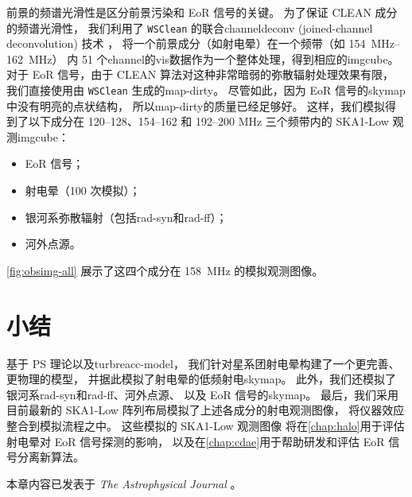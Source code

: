 前景的频谱光滑性是区分前景污染和 EoR 信号的关键。
为了保证 CLEAN 成分的频谱光滑性，
我们利用了 \texttt{WSClean} 的联合\ac{channel}\ac{deconv}
(joined-channel deconvolution) 技术 \cite{offringa2017}，
将一个前景成分（如射电晕）在一个频带（如 \SIrange{154}{162}{\MHz}）
内 51 个\ac{channel}的\ac{vis}数据作为一个整体处理，得到相应的\ac{imgcube}。
对于 EoR 信号，由于 CLEAN 算法对这种非常暗弱的弥散辐射处理效果有限，
我们直接使用由 \texttt{WSClean} 生成的\ac{map-dirty}。
尽管如此，因为 EoR 信号的\ac{skymap}中没有明亮的点状结构，
所以\ac{map-dirty}的质量已经足够好。
这样，我们模拟得到了以下成分在 \numrange{120}{128}、\numrange{154}{162}
和 \numrange{192}{200} \si{\MHz} 三个频带内的 SKA1-Low 观测\ac{imgcube}：
\begin{itemize}
  \item EoR 信号；
  \item 射电晕（100 次模拟）；
  \item 银河系弥散辐射（包括\ac{rad-syn}和\ac{rad-ff}）；
  \item 河外点源。
\end{itemize}
\autoref{fig:obsimg-all} 展示了这四个成分在 \SI{158}{\MHz} 的模拟观测图像。


\section{小结}

基于 \ac{PS} 理论以及\ac{turbreacc-model}，
我们针对星系团射电晕构建了一个更完善、更物理的模型，
并据此模拟了射电晕的低频射电\ac{skymap}。
此外，我们还模拟了银河系\ac{rad-syn}和\ac{rad-ff}、河外点源、
以及 EoR 信号的\ac{skymap}。
最后，我们采用目前最新的 SKA1-Low 阵列布局模拟了上述各成分的射电观测图像，
将仪器效应整合到模拟流程之中。
这些模拟的 SKA1-Low 观测图像
将在\autoref{chap:halo}用于评估射电晕对 EoR 信号探测的影响，
以及在\autoref{chap:cdae}用于帮助研发和评估 EoR 信号分离新算法。

本章内容已发表于 \textit{The Astrophysical Journal} \cite{li.halo}。

